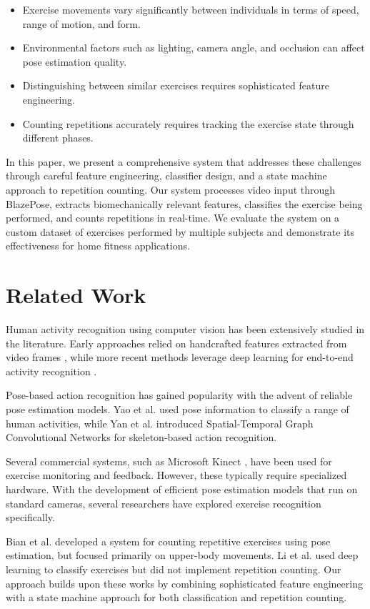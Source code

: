 \documentclass[conference]{IEEEtran}
\begin{document}
\begin{itemize}
    \item Exercise movements vary significantly between individuals in terms of speed, range of motion, and form.
    \item Environmental factors such as lighting, camera angle, and occlusion can affect pose estimation quality.
    \item Distinguishing between similar exercises requires sophisticated feature engineering.
    \item Counting repetitions accurately requires tracking the exercise state through different phases.
\end{itemize}

In this paper, we present a comprehensive system that addresses these challenges through careful feature engineering, classifier design, and a state machine approach to repetition counting. Our system processes video input through BlazePose, extracts biomechanically relevant features, classifies the exercise being performed, and counts repetitions in real-time. We evaluate the system on a custom dataset of exercises performed by multiple subjects and demonstrate its effectiveness for home fitness applications.

\section{Related Work}
Human activity recognition using computer vision has been extensively studied in the literature. Early approaches relied on handcrafted features extracted from video frames \cite{relatedwork1}, while more recent methods leverage deep learning for end-to-end activity recognition \cite{relatedwork2}.

Pose-based action recognition has gained popularity with the advent of reliable pose estimation models. Yao et al. \cite{relatedwork3} used pose information to classify a range of human activities, while Yan et al. \cite{relatedwork4} introduced Spatial-Temporal Graph Convolutional Networks for skeleton-based action recognition.

Several commercial systems, such as Microsoft Kinect \cite{relatedwork5}, have been used for exercise monitoring and feedback. However, these typically require specialized hardware. With the development of efficient pose estimation models that run on standard cameras, several researchers have explored exercise recognition specifically.

Bian et al. \cite{relatedwork6} developed a system for counting repetitive exercises using pose estimation, but focused primarily on upper-body movements. Li et al. \cite{relatedwork7} used deep learning to classify exercises but did not implement repetition counting. Our approach builds upon these works by combining sophisticated feature engineering with a state machine approach for both classification and repetition counting.
\end{document}
